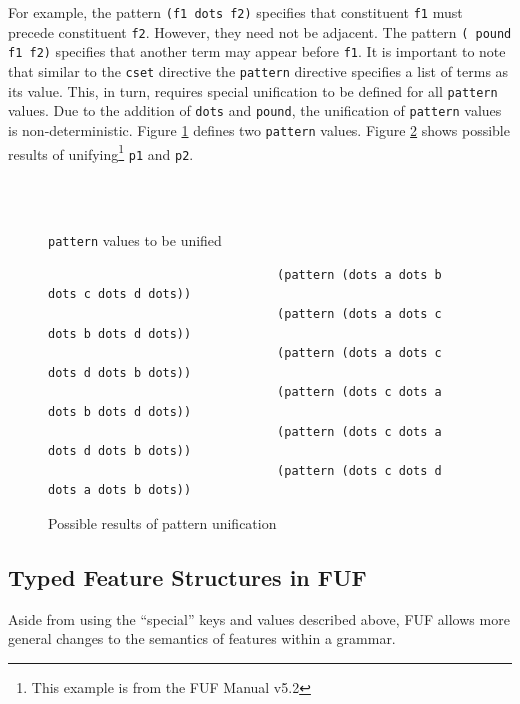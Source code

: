 \documentclass[12pt]{article}
\begin{document}
{For example, the pattern \texttt{(f1 dots f2)} specifies that constituent \texttt{f1} must precede 
constituent \texttt{f2}. However, they need not be adjacent. The pattern \texttt{( pound f1 f2)}
specifies that another term may appear before \texttt{f1}.
It is important to note that similar to the \texttt{cset} directive the \texttt{pattern} directive specifies
a list of terms as its value. This, in turn, requires special unification to be defined for all \texttt{pattern}
values. Due to the addition of \texttt{dots} and \texttt{pound}, the unification of \texttt{pattern} values
is non-deterministic. Figure \ref{pattern-unification1} defines two \texttt{pattern} values. 
Figure \ref{pattern-unification2} shows possible results of unifying\footnote{This example is from the 
FUF Manual v5.2}  \texttt{p1} and \texttt{p2}.
\begin{figure}[h!]
    \centering
{\scriptsize
{} \\
 \\
}
\caption{\texttt{pattern} values to be unified}
\label{pattern-unification1}
\end{figure}

\begin{figure}[h!]
{\scriptsize
\begin{verbatim}
                                (pattern (dots a dots b dots c dots d dots)) 
                                (pattern (dots a dots c dots b dots d dots)) 
                                (pattern (dots a dots c dots d dots b dots)) 
                                (pattern (dots c dots a dots b dots d dots)) 
                                (pattern (dots c dots a dots d dots b dots)) 
                                (pattern (dots c dots d dots a dots b dots)) 
\end{verbatim}
}
\caption{Possible results of pattern unification}
\label{pattern-unification2}
\end{figure}

\subsection{Typed Feature Structures in FUF}
Aside from using the ``special'' keys and values described above, FUF allows more general changes 
to the semantics of features within a grammar.  

}
\end{document}

